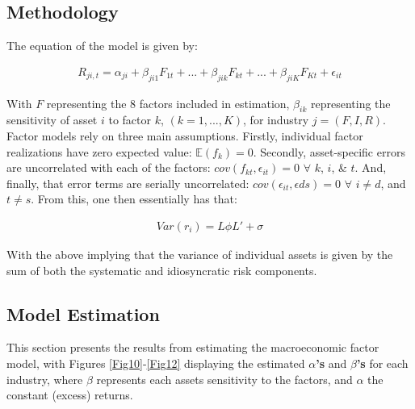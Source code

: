 \documentclass[11pt,preprint, authoryear]{elsarticle}
\numberwithin{equation}{section}
\numberwithin{figure}{section}
\numberwithin{table}{section}
\begin{document}
\hypertarget{methodology}{%
\subsection{\texorpdfstring{Methodology
\label{Meth}}{Methodology }}\label{methodology}}

The equation of the model is given by:

\begin{align}
R_{ji,t}=\alpha_{ji} + \beta_{ji1}F_{1t} + ... + \beta_{jik}F_{kt} +...+\beta_{jiK}F_{Kt} +\epsilon_{it}
\end{align}

With \textbf{\(F\)} representing the 8 factors included in estimation,
\(\beta_{ik}\) representing the sensitivity of asset \(i\) to factor
\(k\), \((k=1,...,K)\), for industry \(j=(F,I,R)\). Factor models rely
on three main assumptions. Firstly, individual factor realizations have
zero expected value: \(\mathbb{E}(f_k)=0\). Secondly, asset-specific
errors are uncorrelated with each of the factors:
\(cov(f_{kt}, \epsilon_{it})=0\) \(\forall\) \(k\), \(i\), \& \(t\).
And, finally, that error terms are serially uncorrelated:
\(cov(\epsilon_{it}, \epsilon{ds})=0\) \(\forall\) \(i\neq d\), and
\(t \neq s\). From this, one then essentially has that:

\begin{align}
Var(r_{i}) = L\phi L' + \sigma
\end{align}

With the above implying that the variance of individual assets is given
by the sum of both the systematic and idiosyncratic risk components.

\hypertarget{model-estimation}{%
\subsection{\texorpdfstring{Model Estimation
\label{Est}}{Model Estimation }}\label{model-estimation}}

This section presents the results from estimating the macroeconomic
factor model, with Figures \ref{Fig10}-\ref{Fig12} displaying the
estimated \textbf{\(\alpha\)'s} and \textbf{\(\beta\)'s} for each
industry, where \(\beta\) represents each assets sensitivity to the
factors, and \(\alpha\) the constant (excess) returns.
\end{document}
